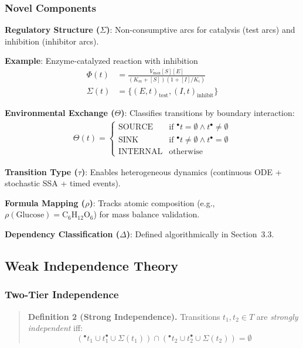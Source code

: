 \documentclass{article}
\newcommand{\preset}[1]{\ensuremath{{}^{\bullet}#1}}
\newcommand{\postset}[1]{\ensuremath{#1^{\bullet}}}
\newcommand{\RegSet}[1]{\ensuremath{\Sigma(#1)}}
\begin{document}
\subsubsection{Novel Components}

\textbf{Regulatory Structure ($\Sigma$)}: Non-consumptive arcs for catalysis (test arcs) and inhibition (inhibitor arcs).

\textbf{Example}: Enzyme-catalyzed reaction with inhibition
\begin{align}
\Phi(t) &= \frac{V_{\max} [S] [E]}{(K_m + [S])(1 + [I]/K_i)} \\
\Sigma(t) &= \{(E,t)_{\text{test}}, (I,t)_{\text{inhibit}}\}
\end{align}

\textbf{Environmental Exchange ($\Theta$)}: Classifies transitions by boundary interaction:
\begin{align}
\Theta(t) = \begin{cases}
\text{SOURCE} & \text{if } \preset{t} = \emptyset \land \postset{t} \neq \emptyset \\
\text{SINK} & \text{if } \preset{t} \neq \emptyset \land \postset{t} = \emptyset \\
\text{INTERNAL} & \text{otherwise}
\end{cases}
\end{align}

\textbf{Transition Type ($\tau$)}: Enables heterogeneous dynamics (continuous ODE + stochastic SSA + timed events).

\textbf{Formula Mapping ($\rho$)}: Tracks atomic composition (e.g., $\rho(\text{Glucose}) = \text{C}_6\text{H}_{12}\text{O}_6$) for mass balance validation.

\textbf{Dependency Classification ($\Delta$)}: Defined algorithmically in Section~3.3.

\subsection{Weak Independence Theory}

\subsubsection{Two-Tier Independence}

\begin{quote}
\textbf{Definition 2 (Strong Independence).}
Transitions $t_1, t_2 \in T$ are \emph{strongly independent} iff:
\begin{equation}
(\preset{t_1} \cup \postset{t_1} \cup \RegSet{t_1}) \cap (\preset{t_2} \cup \postset{t_2} \cup \RegSet{t_2}) = \emptyset
\end{equation}
\end{quote}
\end{document}
